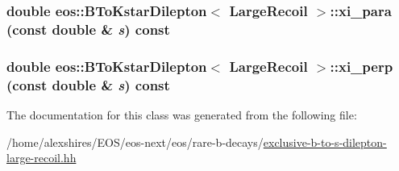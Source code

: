 \label{classeos_1_1BToKstarDilepton_3_01LargeRecoil_01_4_a535ddfbdc0000407bd98814504308556}
\hypertarget{classeos_1_1BToKstarDilepton_3_01LargeRecoil_01_4_aafe87996e1cd2a71ede48a745683a4a8}{
\subsubsection[{xi\_\-para}]{\setlength{\rightskip}{0pt plus 5cm}double eos::BToKstarDilepton$<$ {\bf LargeRecoil} $>$::xi\_\-para (const double \& {\em s}) const}}
\label{classeos_1_1BToKstarDilepton_3_01LargeRecoil_01_4_aafe87996e1cd2a71ede48a745683a4a8}
\hypertarget{classeos_1_1BToKstarDilepton_3_01LargeRecoil_01_4_adda7df580794e776e15a5cef3c3b08f2}{
\subsubsection[{xi\_\-perp}]{\setlength{\rightskip}{0pt plus 5cm}double eos::BToKstarDilepton$<$ {\bf LargeRecoil} $>$::xi\_\-perp (const double \& {\em s}) const}}
\label{classeos_1_1BToKstarDilepton_3_01LargeRecoil_01_4_adda7df580794e776e15a5cef3c3b08f2}


The documentation for this class was generated from the following file:\begin{DoxyCompactItemize}
\item 
/home/alexshires/EOS/eos-\/next/eos/rare-\/b-\/decays/\hyperlink{exclusive-b-to-s-dilepton-large-recoil_8hh}{exclusive-\/b-\/to-\/s-\/dilepton-\/large-\/recoil.hh}\end{DoxyCompactItemize}
